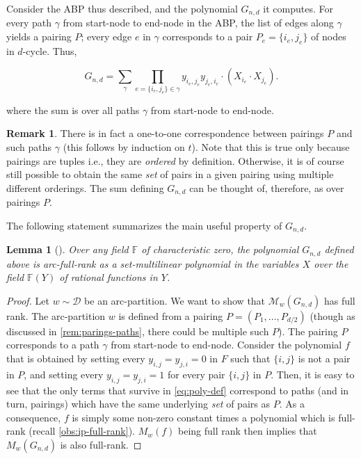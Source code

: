 \documentclass[10pt,a4paper]{article}
\newtheorem{lem}[theorem]{Lemma}
\theoremstyle{definition}%
\newtheorem{remark}[theorem]{Remark}
\theoremstyle{plain}
\newcommand{\F}{\mathbb F}
\newcommand{\calD}{\mathcal{D}}
\newcommand{\calM}{\mathcal{M}}
\begin{document}
Consider the ABP thus described, and the polynomial $G_{n,d}$ it computes. For every path $\gamma$
from start-node to end-node in the ABP, the list of edges along $\gamma$ yields a pairing $P$; every edge $e$
in $\gamma$ corresponds to a pair $P_e = \{i_e, j_e\}$ of nodes in $d$-cycle. Thus,

\begin{equation}\label{eq:poly-def}
  G_{n,d} = \sum_{\gamma} \prod_{e = \{i_e, j_e\} \in \gamma}y_{i_e,j_e}y_{j_e,i_e} \cdot (X_{i_e}\cdot X_{j_e}). 
\end{equation}

where the sum is over all paths $\gamma$ from start-node to end-node. 

\begin{remark}\label{rem:parings-paths}
There is in fact a one-to-one
correspondence between pairings $P$ and such paths $\gamma$ (this follows by induction on $t$). {Note that this is true only because pairings are tuples i.e., they are \emph{ordered} by definition. Otherwise, it is of course still possible to obtain the same \emph{set} of pairs in a given pairing using multiple different orderings.} The sum
defining $G_{n,d}$ can be thought of, therefore, as over pairings $P$.  
\end{remark}

The following statement summarizes the main useful property of $G_{n,d}$.

\begin{lem}[\cite{KushS23}]\label{lem:Fn-VBP-props}
Over any field $\F$ of characteristic zero, the polynomial $ G_{n,d}$ defined above is arc-full-rank as a set-multilinear polynomial in the variables $X$ over the field $\F(Y)$ of rational functions
in $Y$.
\end{lem}

\begin{proof}
    Let $w\sim \calD$ be an arc-partition. 
    We want to show that $\calM_w(G_{n,d})$ has full rank. 
    The arc-partition $w$ is defined from a pairing $P = (P_1,\ldots,P_{d/2})$ (though as discussed in \autoref{rem:parings-paths}, there could be multiple such $P$). 
    The pairing $P$ corresponds to a path $\gamma$ from start-node to end-node. 
    Consider the polynomial $f$ that is obtained by setting every $y_{i,j} = y_{j,i} = 0$ in $F$ such that $\{i,j\}$ is not a pair in $P$, and setting every $y_{i,j} = y_{j,i} = 1$ for every pair $\{i,j\}$ in $P$. 
    Then, it is easy to see that the only terms that survive in \autoref{eq:poly-def} correspond to paths (and in turn, pairings) which have the same underlying \emph{set} of pairs as $P$.
    As a consequence, $f$ is simply some non-zero constant times a polynomial which is full-rank (recall \autoref{obs:ip-full-rank}).
    $M_w(f)$ being full rank then implies that $M_w(G_{n,d})$ is also full-rank.
\end{proof}
\end{document}

